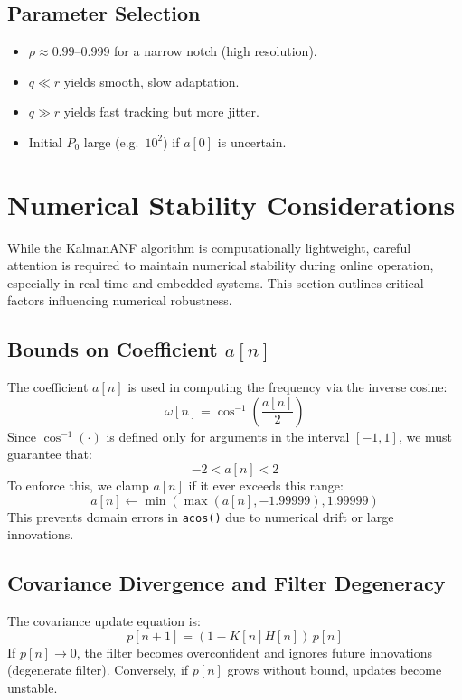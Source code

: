 \documentclass{article}
\begin{document}
\subsection{Parameter Selection}
\begin{itemize}
  \item \(\rho\approx0.99\)–0.999 for a narrow notch (high resolution).  
  \item \(q\ll r\) yields smooth, slow adaptation.  
  \item \(q\gg r\) yields fast tracking but more jitter.  
  \item Initial \(P_0\) large (e.g.\ \(10^2\)) if \(a[0]\) is uncertain.  
\end{itemize}

\section{Numerical Stability Considerations}

While the KalmanANF algorithm is computationally lightweight, careful attention is required to maintain numerical stability during online operation, especially in real-time and embedded systems. This section outlines critical factors influencing numerical robustness.

\subsection{Bounds on Coefficient \texorpdfstring{$a[n]$}{a[n]}}

The coefficient \( a[n] \) is used in computing the frequency via the inverse cosine:
\[
\omega[n] = \cos^{-1}\left(\frac{a[n]}{2}\right)
\]
Since \( \cos^{-1}(\cdot) \) is defined only for arguments in the interval \([-1, 1]\), we must guarantee that:
\[
-2 < a[n] < 2
\]
To enforce this, we clamp \( a[n] \) if it ever exceeds this range:
\[
a[n] \gets \min\left(\max\left(a[n], -1.99999\right), 1.99999\right)
\]
This prevents domain errors in \texttt{acos()} due to numerical drift or large innovations.

\subsection{Covariance Divergence and Filter Degeneracy}

The covariance update equation is:
\[
p[n+1] = (1 - K[n] H[n])\,p[n]
\]
If \( p[n] \to 0 \), the filter becomes overconfident and ignores future innovations (degenerate filter). Conversely, if \( p[n] \) grows without bound, updates become unstable.
\end{document}
